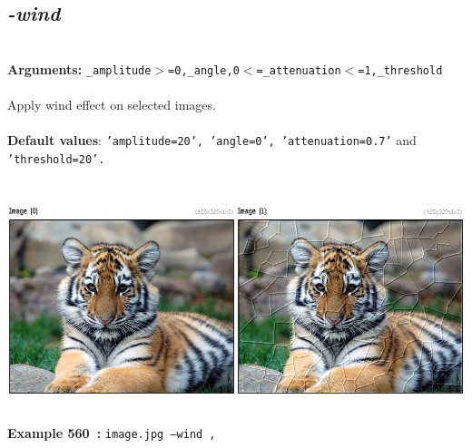 \documentclass[a4paper,11pt,twoside]{book}
\begin{document}
\subsection{\emph{-wind} }\vspace*{-0.5em}
~\\\textbf{Arguments: } 
{\small \texttt{\_amplitude$>$=0,\_angle,0$<$=\_attenuation$<$=1,\_threshold}}\\~\\
Apply wind effect on selected images.
~\\~\\\textbf{Default values}: {\small \texttt{'amplitude=20', 'angle=0', 'attenuation=0.7'} and \texttt{'threshold=20'.}}
\begin{center}\includegraphics[keepaspectratio=true,height=7cm,width=\textwidth]{img/gmic_def560.jpg}\\
{\footnotesize \textbf{Example 560~:} \texttt{image.jpg --wind ,}}
\end{center}
\end{document}
